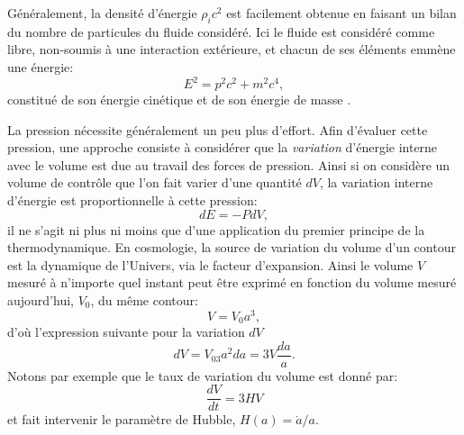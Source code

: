 Généralement, la densité d'énergie $\rho_i c^2$ est facilement obtenue en faisant un bilan du nombre de particules du fluide considéré. Ici le fluide est considéré comme libre, non-soumis à une interaction extérieure, et chacun de ses éléments emmène une énergie:
\begin{equation}
E^2=p^2c^2+m^2c^4,
\end{equation}
constitué de son énergie cinétique et de son énergie de masse .

La pression nécessite généralement un peu plus d'effort. Afin d'évaluer cette pression, une approche consiste à considérer que la \textit{variation} d'énergie interne avec le volume est due au travail des forces de pression. Ainsi si on considère un volume de contrôle que l'on fait varier d'une quantité $dV$, la variation interne d'énergie est proportionnelle à cette pression:
\begin{equation}
dE=-PdV,
\label{e:therm1}
\end{equation}
il ne s'agit ni plus ni moins que d'une application du premier principe de la thermodynamique. En cosmologie, la source de variation du volume d'un contour est la dynamique de l'Univers, via le facteur d'expansion. Ainsi le volume $V$ mesuré à n'importe quel instant peut être exprimé en fonction du volume mesuré aujourd'hui, $V_0$, du même contour:
\begin{equation}
V=V_0a^3,
\end{equation}
d'où l'expression suivante pour la variation $dV$
\begin{equation}
dV=V_03a^2da=3V\frac{da}{a}.
\label{e:dV}
\end{equation}
Notons par exemple que le taux de variation du volume est donné par:
\begin{equation}
\frac{dV}{dt}=3HV
\end{equation}
et fait intervenir le paramètre de Hubble, $H(a)=\dot a/a$.

